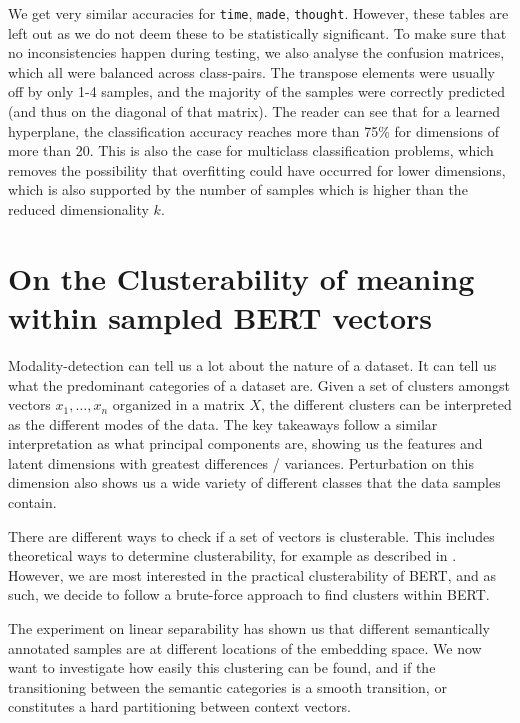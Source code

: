 \documentclass[a4paper,12pt,oneside,openright]{report}
\begin{document}
\hfill \break

We get very similar accuracies for \Verb#time#, \Verb#made#, \Verb#thought#.
However, these tables are left out as we do not deem these to be statistically significant.
To make sure that no inconsistencies happen during testing, we also analyse the confusion matrices, which all were balanced across class-pairs.
The transpose elements were usually off by only 1-4 samples, and the majority of the samples were correctly predicted (and thus on the diagonal of that matrix).
The reader can see that for a learned hyperplane, the classification accuracy reaches more than 75\% for dimensions of more than 20.
This is also the case for multiclass classification problems, which removes the possibility that overfitting could have occurred for lower dimensions, which is also supported by the number of samples which is higher than the reduced dimensionality $k$.

\section{On the Clusterability of meaning within sampled BERT vectors} \label{experiment_BERT_clusterability}

Modality-detection can tell us a lot about the nature of a dataset.
It can tell us what the predominant categories of a dataset are.
Given a set of clusters amongst vectors $x_1, \ldots, x_n$ organized in a matrix $X$, the different clusters can be interpreted as the different modes of the data.
The key takeaways follow a similar interpretation as what principal components are, showing us the features and latent dimensions with greatest differences / variances.
Perturbation on this dimension also shows us a wide variety of different classes that the data samples contain.

There are different ways to check if a set of vectors is clusterable. This includes theoretical ways to determine clusterability, for example as described in \cite{ackerman09, mccarthy16}. 
However, we are most interested in the practical clusterability of BERT, and as such, we decide to follow a brute-force approach to find clusters within BERT.

The experiment on linear separability has shown us that different semantically annotated samples are at different locations of the embedding space.
We now want to investigate how easily this clustering can be found, and if the transitioning between the semantic categories is a smooth transition, or constitutes a hard partitioning between context vectors.
\end{document}
